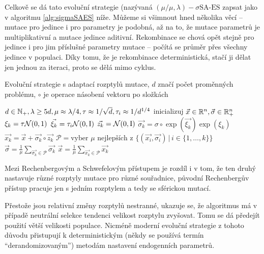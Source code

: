Celkově se dá tato evoluční strategie (nazývaná $(\mu/\mu, \lambda)-\sigma\text{SA-ES}$ zapsat jako v algoritmu \ref{alg:sigmaSAES} níže. Můžeme si všimnout hned několika věcí -- mutace pro jedince i pro parametry je podobná, až na to, že mutace parametrů je multiplikativní a mutace jedince aditivní. Rekombinace se chová opět stejně pro jedince i pro jim příslušné parametry mutace -- počítá se průměr přes všechny jedince v populaci. Díky tomu, že je rekombinace deterministická, stačí ji dělat jen jednou za iteraci, proto se dělá mimo  cyklus.

\begin{algorithm}
\caption{Evoluční strategie s adaptací rozptylů mutace, $d$ značí počet proměnných problému, $\circ$ je operace násobení vektoru po složkách}
\label{alg:sigmaSAES}
\begin{algorithmic}[1]
\Require $d \in \mathbb{N}_+, \lambda \geq 5d, \mu \approx \lambda/4, \tau \approx 1/\sqrt{d}, \tau_i \approx 1/d^{1/4}$
\State inicializuj $\vec{x} \in {\ensuremath{\mathbb{R}}}^n, \vec{\sigma} \in {\ensuremath{\mathbb{R}}}^n_+$
		\State $\xi_k = \tau\mathcal{N}(0, 1)$ 
		\State $\vec{\xi_k} = \tau_i\mathcal{N}(0, \mathrm{I})$ 
		\State $\vec{z_k} = \mathcal{N}(0, \mathrm{I})$ 
		\State $\vec{\sigma_k} = \sigma \circ \exp(\vec{\xi_k})\exp(\xi_k)$
		\State $\vec{x_k} = \vec{x} + \vec{\sigma_k}\circ\vec{z_k}$
	\EndFor
	\State $\mathcal{P} = \text{vyber } \mu \text{ nejlepších z } \{(\vec{x_i}, \vec{\sigma_i})\,|\,i \in \{1, \dots, k\}\}$
	\State $\vec{\sigma} = \frac{1}{\mu}\sum_{\vec{\sigma_k} \in \mathcal{P}}\vec{\sigma_k}$
	\State $\vec{x} = \frac{1}{\mu}\sum_{\vec{x_k} \in \mathcal{P}}\vec{x_k}$
\EndWhile
\EndProcedure
\end{algorithmic}
\end{algorithm}

Mezi Rechenbergovým a Schwefelovým přístupem je rozdíl i v tom, že ten druhý nastavuje různé rozptyly mutace pro různé souřadnice, původní Rechenbergův přístup pracuje jen s jedním rozptylem a tedy se sférickou mutací.

Přestože jsou relativní změny rozptylů nestranné, ukazuje se, že algoritmus má v případě neutrální selekce tendenci velikost rozptylu zvyšovat. Tomu se dá předejít použití větší velikosti populace. Nicméně moderní evoluční strategie z tohoto důvodu přistupují k deterministickým (někdy se používá termín ``derandomizovaným'') metodám nastavení endogenních parametrů.

